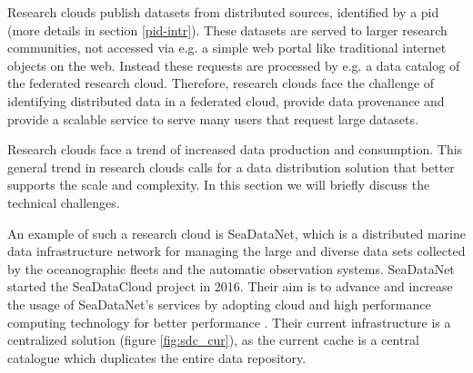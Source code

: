 

Research clouds publish datasets from distributed sources, identified by a \gls{pid} (more details in section \ref{pid-intr}). These datasets are served to larger research communities, not accessed via e.g. a simple web portal like traditional internet objects on the web. Instead these requests are processed by e.g. a data catalog of the federated research cloud. Therefore, research clouds face the challenge of identifying distributed data in a federated cloud, provide data provenance and provide a scalable service to serve many users that request large datasets.

Research clouds face a trend of increased data production and consumption. This general trend in research clouds calls for a data distribution solution that better supports the scale and complexity. In this section we will briefly discuss the technical challenges.

An example of such a research cloud is SeaDataNet, which is a distributed marine data infrastructure network for managing the large and diverse data sets collected by the oceanographic fleets and the automatic observation systems. SeaDataNet started the SeaDataCloud project in 2016. Their aim is to advance and increase the usage of SeaDataNet's services by adopting cloud and high performance computing technology for better performance \cite{sdc}. Their current infrastructure is a centralized solution (figure \ref{fig:sdc_cur}), as the current cache is a central catalogue which duplicates the entire data repository.

